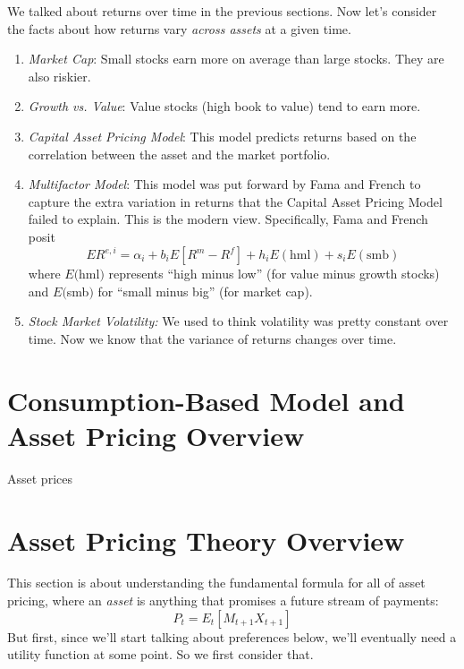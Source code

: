 \documentclass[a4paper,12pt]{scrartcl}
\begin{document}
We talked about returns over time in the previous sections. Now 
let's consider the facts about how returns vary \emph{across assets}
at a given time.
\begin{enumerate}
    \item {\sl Market Cap}: Small stocks earn more on average than
	large stocks.  They are also riskier.
    \item {\sl Growth vs. Value}: Value stocks (high book to value)
	tend to earn more.
    \item {\sl Capital Asset Pricing Model}: This model predicts
	returns based on the correlation between the asset and
	the market portfolio.
    \item {\sl Multifactor Model}: This model was put forward by
	Fama and French to capture the extra variation in returns
	that the Capital Asset Pricing Model failed to explain.
	This is the modern view. Specifically, Fama and French posit
	\begin{equation}
	    \label{ff3fm}
	    ER^{e,i} = \alpha_i + b_iE[R^m - R^f] + h_i E(\text{hml})
		+ s_i E(\text{smb})
	\end{equation}
	where $E($hml$)$ represents ``high minus low'' (for 
	value minus growth stocks)
	and $E($smb$)$ for ``small minus big'' (for market cap).
    \item {\sl Stock Market Volatility:} We used to think volatility
	was pretty constant over time.  Now we know that the
	variance of returns changes over time.
\end{enumerate}

\clearpage
\section{Consumption-Based Model and Asset Pricing Overview}

Asset prices 

\newpage
\section{Asset Pricing Theory Overview}

This section is about understanding the fundamental formula for 
all of asset pricing, where an \emph{asset} is anything
that promises a future stream of payments: 
\begin{equation}
    \label{pemx}
    P_t = E_t[M_{t+1} X_{t+1}]
\end{equation}
But first, since we'll start talking about preferences below, 
we'll eventually need a utility function at some point. So we 
first consider that.
\end{document}

